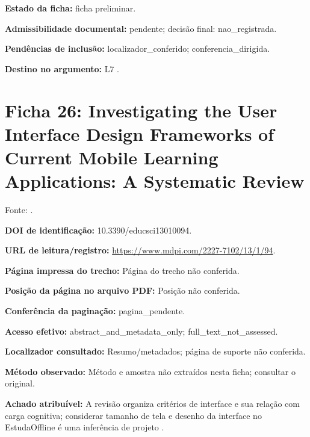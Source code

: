 \noindent\textbf{Estado da ficha:} ficha preliminar.\par\medskip

\noindent\textbf{Admissibilidade documental:} pendente; decisão final: nao\_registrada.\par\medskip

\noindent\textbf{Pendências de inclusão:} localizador\_conferido; conferencia\_dirigida.\par\medskip

\noindent\textbf{Destino no argumento:} L7 .

\clearpage\section*{Ficha 26: Investigating the User Interface Design Frameworks of Current Mobile Learning Applications: A Systematic Review}

Fonte: \citet{cob2023}.

\noindent\textbf{DOI de identificação:} 10.3390/educsci13010094.\par\medskip

\noindent\textbf{URL de leitura/registro:} \url{https://www.mdpi.com/2227-7102/13/1/94}.\par\medskip

\noindent\textbf{Página impressa do trecho:} Página do trecho não conferida.\par\medskip

\noindent\textbf{Posição da página no arquivo PDF:} Posição não conferida.\par\medskip

\noindent\textbf{Conferência da paginação:} pagina\_pendente.\par\medskip

\noindent\textbf{Acesso efetivo:} abstract\_and\_metadata\_only; full\_text\_not\_assessed.\par\medskip

\noindent\textbf{Localizador consultado:} Resumo/metadados; página de suporte não conferida.\par\medskip

\noindent\textbf{Método observado:} Método e amostra não extraídos nesta ficha; consultar o original.\par\medskip

\noindent\textbf{Achado atribuível:} A revisão organiza critérios de interface e sua relação com carga cognitiva; considerar tamanho de tela e desenho da interface no EstudaOffline é uma inferência de projeto \citep{cob2023}.\par\medskip


